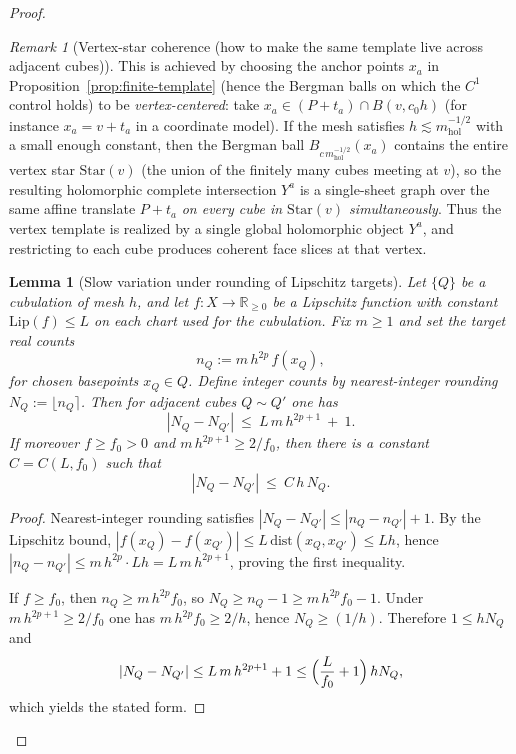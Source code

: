 \documentclass[11pt]{article}
\numberwithin{equation}{section}  %
\theoremstyle{plain}
\newtheorem{lemma}[theorem]{Lemma}
\theoremstyle{definition}
\theoremstyle{remark}
\newtheorem{remark}[theorem]{Remark}
\newcommand{\R}{\mathbb{R}}
\newcommand{\mhol}{m_{\mathrm{hol}}} %
\begin{document}
\begin{proof}
\begin{remark}[Vertex-star coherence (how to make the same template live across adjacent cubes)]
\smallskip\noindent
This is achieved by choosing the anchor points $x_a$ in Proposition~\ref{prop:finite-template} (hence the Bergman balls on which the $C^1$ control holds)
to be \emph{vertex-centered}: take $x_a\in (P+t_a)\cap B(v,c_0h)$ (for instance $x_a=v+t_a$ in a coordinate model).
If the mesh satisfies $h\lesssim \mhol^{-1/2}$ with a small enough constant, then the Bergman ball $B_{c\,\mhol^{-1/2}}(x_a)$ contains the entire
vertex star $\mathrm{Star}(v)$ (the union of the finitely many cubes meeting at $v$), so the resulting holomorphic complete intersection $Y^a$
is a single-sheet graph over the same affine translate $P+t_a$ \emph{on every cube in $\mathrm{Star}(v)$ simultaneously}.
Thus the vertex template is realized by a single global holomorphic object $Y^a$, and restricting to each cube produces coherent
face slices at that vertex.
\end{remark}


\begin{lemma}[Slow variation under rounding of Lipschitz targets]\label{lem:slow-variation-rounding}
Let $\{Q\}$ be a cubulation of mesh $h$, and let $f: X\to\R_{\ge 0}$ be a Lipschitz function with constant
$\mathrm{Lip}(f)\le L$ on each chart used for the cubulation.
Fix $m\ge 1$ and set the target real counts
\[
n_Q := m\,h^{2p}\, f(x_Q),
\]
for chosen basepoints $x_Q\in Q$.
Define integer counts by nearest-integer rounding $N_Q:=\lfloor n_Q\rceil$.
Then for adjacent cubes $Q\sim Q'$ one has
\[
|N_Q-N_{Q'}|\ \le\ L\,m\,h^{2p+1}\ +\ 1.
\]
If moreover $f\ge f_0>0$ and $m\,h^{2p+1}\ge 2/f_0$, then there is a constant $C=C(L,f_0)$ such that
\[
|N_Q-N_{Q'}|\ \le\ C\,h\,N_Q.
\]
\end{lemma}

\begin{proof}
Nearest-integer rounding satisfies $|N_Q-N_{Q'}|\le |n_Q-n_{Q'}|+1$.
By the Lipschitz bound, $|f(x_Q)-f(x_{Q'})|\le L\,\mathrm{dist}(x_Q,x_{Q'})\le Lh$, hence
$|n_Q-n_{Q'}|\le m\,h^{2p}\cdot Lh = L\,m\,h^{2p+1}$, proving the first inequality.

If $f\ge f_0$, then $n_Q\ge m\,h^{2p} f_0$, so $N_Q\ge n_Q-1 \ge m\,h^{2p}f_0-1$.
Under $m\,h^{2p+1}\ge 2/f_0$ one has $m\,h^{2p}f_0\ge 2/h$, hence $N_Q\ge (1/h)$.
Therefore $1\le hN_Q$ and
\[
|N_Q-N_{Q'}|\le L\,m\,h^{2p+1}+1 \le \Bigl(\frac{L}{f_0}+1\Bigr)\,hN_Q,
\]
which yields the stated form.
\end{proof}



\end{proof}
\end{document}
